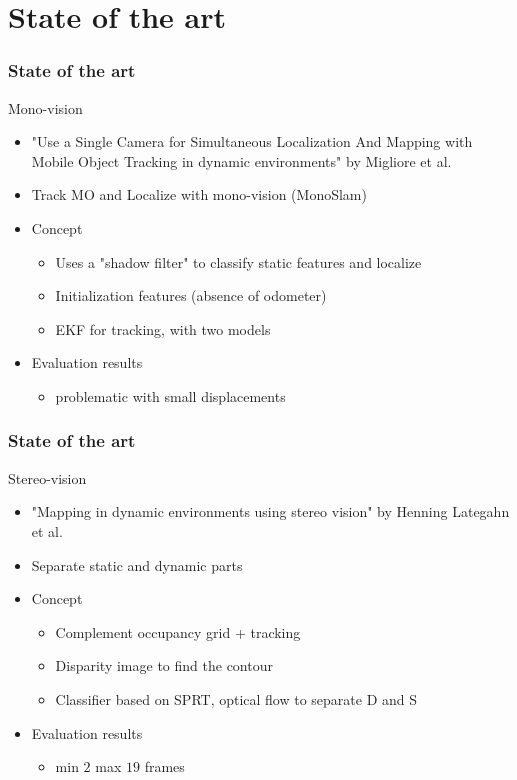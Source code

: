 \documentclass{beamer}
\begin{document}

\section{State of the art}

	\begin{frame}
		\frametitle{State of the art}
		
		\begin{block}{Mono-vision}
			\begin{itemize}
			\item "Use a Single Camera for Simultaneous Localization And Mapping with  Mobile Object Tracking in dynamic environments" by Migliore et al. \cite{Migliore_2009_ICRA}
			\item Track MO and Localize with mono-vision (MonoSlam)
			\item Concept
				\begin{itemize}			
				\item Uses a "shadow filter" to classify static features and localize
				\item Initialization features (absence of odometer)
				\item EKF for tracking, with two models				
				\end{itemize}		
			\item Evaluation results
				\begin{itemize}			
				\item problematic with small displacements
				\end{itemize}	
			\end{itemize}		
		\end{block}
	\end{frame}
	
	\begin{frame}
		\frametitle{State of the art}	
		\begin{block}{Stereo-vision}
			\begin{itemize}
			\item "Mapping in dynamic environments using stereo vision" by Henning Lategahn et al. \cite{DBLP:conf/ivs/LategahnGHKE11}
			\item Separate static and dynamic parts
			\item Concept
				\begin{itemize}			
				\item Complement occupancy grid + tracking
				\item Disparity image to find the contour
				\item Classifier based on SPRT, optical flow to separate D and S				
				\end{itemize}		
			\item Evaluation results
				\begin{itemize}			
				\item min $2$ max $19$ frames
				\end{itemize}							
			\end{itemize}				
		\end{block}
	\end{frame}
\end{document}
